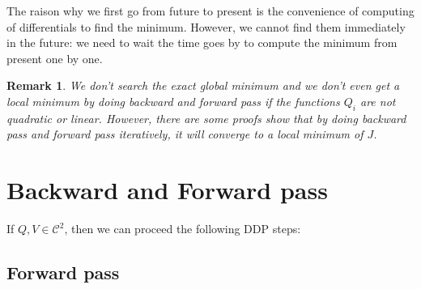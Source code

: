 \documentclass{report}
\newtheorem*{remark}{Remark}
\begin{document}
The raison why we first go from future to present is the convenience of computing of differentials to find the minimum. However, we cannot find them immediately in the future: we need to wait the time goes by to compute the minimum from present one by one.

\begin{remark}	
We don't search the exact global minimum and we don't even get a local minimum by doing backward and forward pass if the functions $Q_i$ are not quadratic or linear. However, there are some proofs show that by doing backward pass and forward pass iteratively, it will converge to a local minimum of $J$.
\end{remark}
\section{Backward and Forward pass}
If $Q, V \in \mathscr{C}^2 $, then we can proceed the following DDP steps:
\subsection{Forward pass}
%
%
%
%
\end{document}
